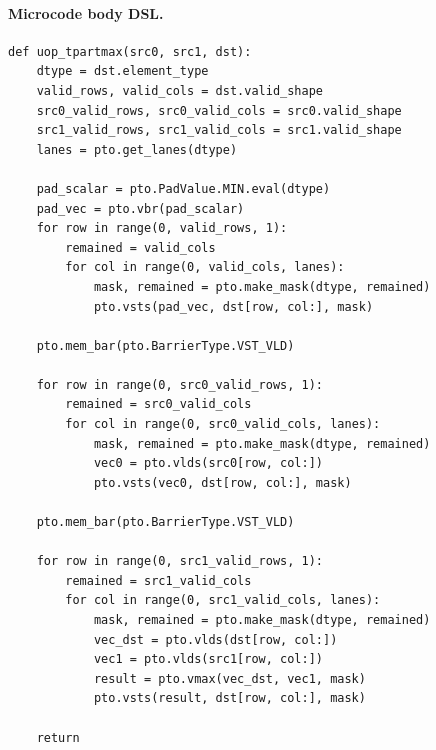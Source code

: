 \paragraph{Microcode body DSL.}
\begin{lstlisting}[style=ptocode]
def uop_tpartmax(src0, src1, dst):
    dtype = dst.element_type
    valid_rows, valid_cols = dst.valid_shape
    src0_valid_rows, src0_valid_cols = src0.valid_shape
    src1_valid_rows, src1_valid_cols = src1.valid_shape
    lanes = pto.get_lanes(dtype)

    pad_scalar = pto.PadValue.MIN.eval(dtype)
    pad_vec = pto.vbr(pad_scalar)
    for row in range(0, valid_rows, 1):
        remained = valid_cols
        for col in range(0, valid_cols, lanes):
            mask, remained = pto.make_mask(dtype, remained)
            pto.vsts(pad_vec, dst[row, col:], mask)

    pto.mem_bar(pto.BarrierType.VST_VLD)

    for row in range(0, src0_valid_rows, 1):
        remained = src0_valid_cols
        for col in range(0, src0_valid_cols, lanes):
            mask, remained = pto.make_mask(dtype, remained)
            vec0 = pto.vlds(src0[row, col:])
            pto.vsts(vec0, dst[row, col:], mask)

    pto.mem_bar(pto.BarrierType.VST_VLD)

    for row in range(0, src1_valid_rows, 1):
        remained = src1_valid_cols
        for col in range(0, src1_valid_cols, lanes):
            mask, remained = pto.make_mask(dtype, remained)
            vec_dst = pto.vlds(dst[row, col:])
            vec1 = pto.vlds(src1[row, col:])
            result = pto.vmax(vec_dst, vec1, mask)
            pto.vsts(result, dst[row, col:], mask)

    return
\end{lstlisting}
\Needspace{0.34\textheight}
